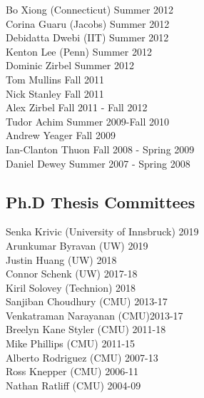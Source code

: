 Bo Xiong (Connecticut) \hfill Summer 2012\\
Corina Guaru (Jacobs) \hfill Summer 2012\\
Debidatta Dwebi (IIT) \hfill Summer 2012\\
Kenton Lee (Penn) \hfill Summer 2012\\
Dominic Zirbel  \hfill Summer 2012\\
Tom Mullins  \hfill Fall 2011\\
Nick Stanley  \hfill Fall 2011\\
Alex Zirbel  \hfill Fall 2011 - Fall 2012\\
Tudor Achim  \hfill Summer 2009-Fall 2010\\
Andrew Yeager  \hfill Fall 2009\\
Ian-Clanton Thuon  \hfill Fall 2008 - Spring 2009\\
Daniel Dewey  \hfill Summer 2007 - Spring 2008\\

\subsection{Ph.D Thesis Committees}
\noindent
Senka Krivic (University of Innsbruck) \hfill 2019\\
Arunkumar Byravan (UW) \hfill 2019\\
Justin Huang (UW) \hfill 2018\\
Connor Schenk (UW) \hfill 2017-18\\
Kiril Solovey (Technion) \hfill 2018\\
Sanjiban Choudhury (CMU) \hfill 2013-17\\
Venkatraman Narayanan (CMU)\hfill 2013-17\\
Breelyn Kane Styler (CMU) \hfill 2011-18\\ 
Mike Phillips (CMU) \hfill 2011-15\\
Alberto Rodriguez (CMU) \hfill 2007-13\\
Ross Knepper  (CMU) \hfill 2006-11\\
Nathan Ratliff (CMU) \hfill 2004-09\\
